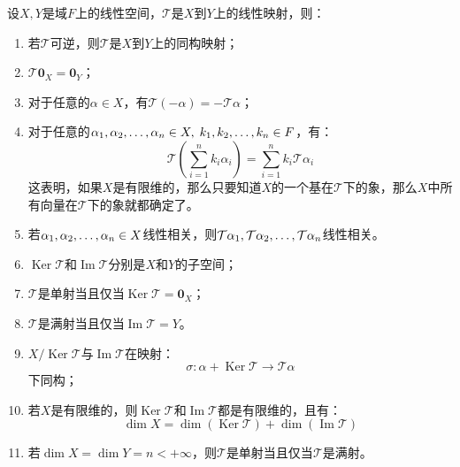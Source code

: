 \begin{property}\label{prop:LinearMapping}
	设$X,Y$是域$F$上的线性空间，$\mathcal{T}$是$X$到$Y$上的线性映射，则：
	\begin{enumerate}
		\item 若$\mathcal{T}$可逆，则$\mathcal{T}$是$X$到$Y$上的同构映射；
		\item $\mathcal{T}\mathbf{0}_X=\mathbf{0}_Y$；
		\item 对于任意的$\alpha\in X$，有$\mathcal{T}(-\alpha)=-\mathcal{T}\alpha$；
		\item 对于任意的$\alpha_1, \alpha_2, \dots, \alpha_{n}\in X,\;k_1, k_2, \dots, k_{n}\in F$，有：
		\begin{equation*}
			\mathcal{T}\left(\sum_{i=1}^{n}k_i\alpha_i\right)=\sum_{i=1}^{n}k_i\mathcal{T}\alpha_i
		\end{equation*}
		这表明，如果$X$是有限维的，那么只要知道$X$的一个基在$\mathcal{T}$下的象，那么$X$中所有向量在$\mathcal{T}$下的象就都确定了。
		\item 若$\alpha_1, \alpha_2, \dots, \alpha_{n}\in X$线性相关，则$\mathcal{T}\alpha_1, \mathcal{T}\alpha_2, \dots, \mathcal{T}\alpha_{n}$线性相关。
		\item $\operatorname{Ker}\mathcal{T}$和$\operatorname{Im}\mathcal{T}$分别是$X$和$Y$的子空间；
		\item $\mathcal{T}$是单射当且仅当$\operatorname{Ker}\mathcal{T}=\mathbf{0}_X$；
		\item $\mathcal{T}$是满射当且仅当$\operatorname{Im}\mathcal{T}=Y$。
		\item $X/\operatorname{Ker}\mathcal{T}$与$\operatorname{Im}\mathcal{T}$在映射：
		\begin{equation*}
			\sigma:\alpha+\operatorname{Ker}\mathcal{T}\longrightarrow\mathcal{T}\alpha
		\end{equation*}
		下同构；
		\item 若$X$是有限维的，则$\operatorname{Ker}\mathcal{T}$和$\operatorname{Im}\mathcal{T}$都是有限维的，且有：
		\begin{equation*}
			\dim X=\dim(\operatorname{Ker}\mathcal{T})+\dim(\operatorname{Im}\mathcal{T})
		\end{equation*}
		\item 若$\dim X=\dim Y=n<+\infty$，则$\mathcal{T}$是单射当且仅当$\mathcal{T}$是满射。
	\end{enumerate}
\end{property}
